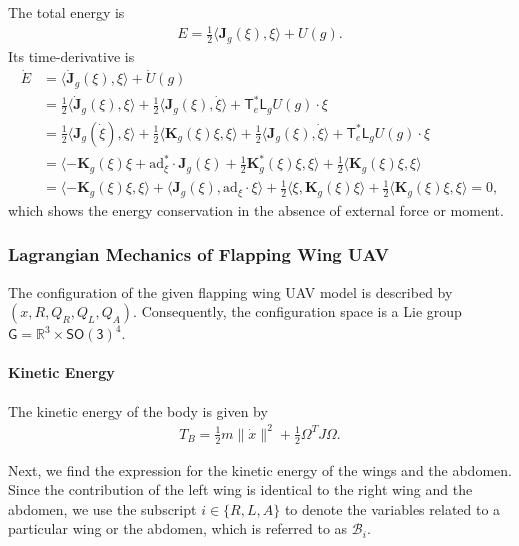 \documentclass[10pt,draft]{article}
\newcommand{\pair}[1]{\ensuremath{\langle #1 \rangle}}
\newcommand{\SO}{\ensuremath{\mathsf{SO(3)}}}
\newcommand{\T}{\ensuremath{\mathsf{T}}}
\renewcommand{\L}{\ensuremath{\mathsf{L}}}
\renewcommand{\Re}{\ensuremath{\mathbb{R}}}
\newcommand{\ad}{\ensuremath{\mathrm{ad}}}
\newcommand{\G}{\ensuremath{\mathsf{G}}}
\begin{document}
The total energy is
\begin{align*}
    E = \frac{1}{2}\pair{\mathbf{J}_g(\xi), \xi} + U(g).
\end{align*}
Its time-derivative is
\begin{align*}
    \dot E & = \pair{ \dot{\mathbf{J}}_g(\xi), \xi} + \dot U(g)\\
           & =  \frac{1}{2}\pair{\dot{\mathbf{J}}_g( \xi),\xi} +
           \frac{1}{2} \pair{ \mathbf{J}_g(\xi),\dot \xi} 
           +  \T_e^*\L_g U(g)\cdot \xi\\
           & = \frac{1}{2}\pair{\mathbf{J}_g(\dot \xi), \xi} + \frac{1}{2}\pair{\mathbf{K}_g(\xi)\xi, \xi} 
           + \frac{1}{2} \pair{ \mathbf{J}_g(\xi),\dot \xi} 
           +  \T_e^*\L_g U(g)\cdot \xi\\
           & = \pair{ - \mathbf{K}_g(\xi)\xi + \ad^*_\xi \cdot \mathbf{J}_g(\xi)  + \frac{1}{2}\mathbf{K}^*_g(\xi)\xi, \xi} + \frac{1}{2}\pair{\mathbf{K}_g(\xi)\xi, \xi} \\
           & = \pair{-\mathbf{K}_g(\xi)\xi, \xi} + \pair{\mathbf{J}_g(\xi), \ad_\xi\cdot \xi} + \frac{1}{2} \pair{\xi, \mathbf{K}_g(\xi)\xi} + \frac{1}{2}\pair{\mathbf{K}_g(\xi)\xi, \xi}  = 0,
\end{align*}
which shows the energy conservation in the absence of external force or moment. 

\subsubsection{Lagrangian Mechanics of Flapping Wing UAV}

The configuration of the given flapping wing UAV model is described by $(x,R,Q_R,Q_L, Q_A)$. 
Consequently, the configuration space is a Lie group $\G=\Re^3\times \SO^4$. 

\paragraph{Kinetic Energy} 
The kinetic energy of the body is given by
\begin{align}
    T_B = \frac{1}{2}m \|\dot x\|^2 + \frac{1}{2} \Omega^T J\Omega.
\end{align}

Next, we find the expression for the kinetic energy of the wings and the abdomen. 
Since the contribution of the left wing is identical to the right wing and the abdomen, we use the subscript $i\in\{R,L,A\}$ to denote the variables related to a particular wing or the abdomen, which is referred to as $\mathcal{B}_i$.
\end{document}
